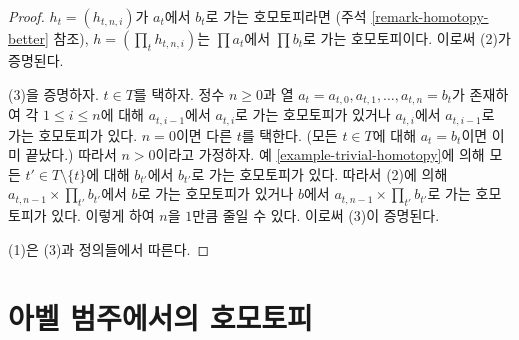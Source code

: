 \begin{proof}
$h_t = (h_{t, n , i})$가 $a_t$에서 $b_t$로 가는 호모토피라면
(주석 \ref{remark-homotopy-better} 참조),
$h = (\prod_t h_{t, n, i})$는 $\prod a_t$에서 $\prod b_t$로 가는
호모토피이다. 이로써 (2)가 증명된다.

\medskip\noindent
(3)을 증명하자. $t \in T$를 택하자. 정수 $n \geq 0$과 열
$a_t = a_{t, 0}, a_{t, 1}, \ldots, a_{t, n} = b_t$가 존재하여 각
$1 \leq i \leq n$에 대해 $a_{t, i - 1}$에서 $a_{t, i}$로 가는
호모토피가 있거나 $a_{t, i}$에서 $a_{t, i - 1}$로 가는 호모토피가 있다.
$n = 0$이면 다른 $t$를 택한다. (모든 $t \in T$에 대해 $a_t = b_t$이면
이미 끝났다.) 따라서 $n > 0$이라고 가정하자.
예 \ref{example-trivial-homotopy}에 의해 모든
$t' \in T \setminus \{t\}$에 대해 $b_{t'}$에서 $b_{t'}$로 가는
호모토피가 있다. 따라서 (2)에 의해
$a_{t, n - 1} \times \prod_{t'} b_{t'}$에서 $b$로 가는 호모토피가 있거나
$b$에서 $a_{t, n - 1} \times \prod_{t'} b_{t'}$로 가는 호모토피가 있다.
이렇게 하여 $n$을 $1$만큼 줄일 수 있다. 이로써 (3)이 증명된다.

\medskip\noindent
(1)은 (3)과 정의들에서 따른다.
\end{proof}

\section{아벨 범주에서의 호모토피}
\label{section-homotopy-abelian}

